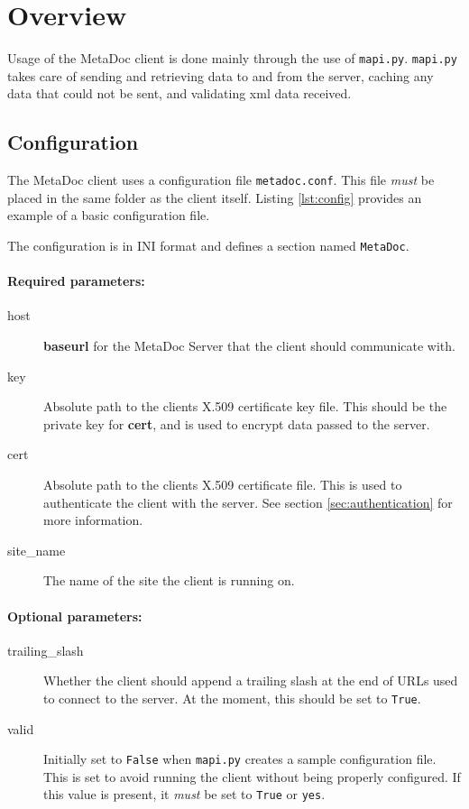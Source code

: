\newpage
\section{Overview}
\label{sec:overview}
Usage of the MetaDoc client is done mainly through the use of \texttt{mapi.py}.
\texttt{mapi.py} takes care of sending and retrieving data to and from the
server, caching any data that could not be sent, and validating \gls{xml} data
received.

\subsection{Configuration}
\label{sec:metadoc_conf}
The MetaDoc client uses a configuration file \texttt{metadoc.conf}. This file
\textit{must} be placed in the same folder as the client itself. Listing
\ref{lst:config} provides an example of a basic configuration file.

The configuration is in INI format and defines a section named
\texttt{MetaDoc}.

\paragraph{Required parameters:}

\begin{description}
    \item[host] \textbf{baseurl} for the MetaDoc Server that the client should
        communicate with.
    \item[key]  Absolute path to the clients X.509 certificate key file. This
        should be the private key for \textbf{cert}, and is used to encrypt
        data passed to the server.
    \item[cert] Absolute path to the clients X.509 certificate file. This is used
        to authenticate the client with the server. See section
        \ref{sec:authentication} for more information.
    \item[site\_name]   The name of the site the client is running on. 
\end{description}

\paragraph{Optional parameters:}

\begin{description}
    \item[trailing\_slash]  Whether the client should append a trailing slash
        at the end of URLs used to connect to the server. At the moment, this
        should be set to \texttt{True}.
    \item[valid]    Initially set to \texttt{False} when \texttt{mapi.py}
        creates a sample configuration file. This is set to avoid running the
        client without being properly configured. If this value is present, it
        \textit{must} be set to \texttt{True} or \texttt{yes}.
\end{description}

